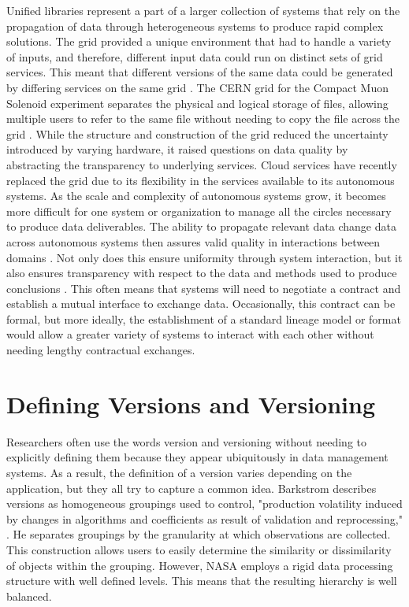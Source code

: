 Unified libraries represent a part of a larger collection of systems that rely on the propagation of data through heterogeneous systems to produce rapid complex solutions.
The grid provided a unique environment that had to handle a variety of inputs, and therefore, different input data could run on distinct sets of grid services.
This meant that different versions of the same data could be generated by differing services on the same grid \cite{Kovse2003VGridAVS}.
The CERN grid for the Compact Muon Solenoid experiment separates the physical and logical storage of files, allowing multiple users to refer to the same file without needing to copy the file across the grid \cite{Holtman:687353}.
While the structure and construction of the grid reduced the uncertainty introduced by varying hardware, it raised questions on data quality by abstracting the transparency to underlying services.
Cloud services have recently replaced the grid due to its flexibility in the services available to its autonomous systems.
As the scale and complexity of autonomous systems grow, it becomes more difficult for one system or organization to manage all the circles necessary to produce data deliverables.
The ability to propagate relevant data change data across autonomous systems then assures valid quality in interactions between domains \cite{Systems02champagne:data}.
Not only does this ensure uniformity through system interaction, but it also ensures transparency with respect to the data and methods used to produce conclusions \cite{Tagger2005}.
This often means that systems will need to negotiate a contract and establish a mutual interface to exchange data.
Occasionally, this contract can be formal, but more ideally, the establishment of a standard lineage model or format would allow a greater variety of systems to interact with each other without needing lengthy contractual exchanges.

\section{Defining Versions and Versioning}

Researchers often use the words version and versioning without needing to explicitly defining them because they appear ubiquitously in data management systems.  As a result, the definition of a version varies depending on the application, but they all try to capture a common idea.  Barkstrom describes versions as homogeneous groupings used to control, "production volatility induced by changes in algorithms and coefficients as result of validation and reprocessing," \cite{Barkstrom2003}.  He separates groupings by the granularity at which observations are collected.  This construction allows users to easily determine the similarity or dissimilarity of objects within the grouping.  However, NASA employs a rigid data processing structure with well defined levels.  This means that the resulting hierarchy is well balanced.


